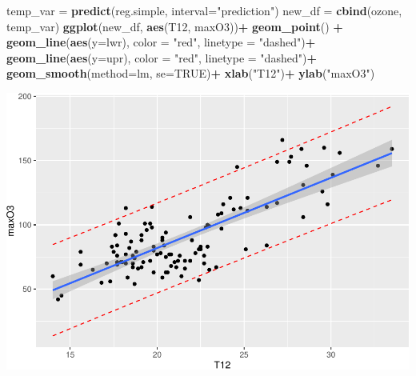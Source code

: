 \documentclass[
]{article}
\newenvironment{Shaded}{\begin{snugshade}}{\end{snugshade}}
\newcommand{\AttributeTok}[1]{\textcolor[rgb]{0.13,0.29,0.53}{#1}}
\newcommand{\ConstantTok}[1]{\textcolor[rgb]{0.56,0.35,0.01}{#1}}
\newcommand{\FunctionTok}[1]{\textcolor[rgb]{0.13,0.29,0.53}{\textbf{#1}}}
\newcommand{\NormalTok}[1]{#1}
\newcommand{\OtherTok}[1]{\textcolor[rgb]{0.56,0.35,0.01}{#1}}
\newcommand{\SpecialCharTok}[1]{\textcolor[rgb]{0.81,0.36,0.00}{\textbf{#1}}}
\newcommand{\StringTok}[1]{\textcolor[rgb]{0.31,0.60,0.02}{#1}}
\begin{document}
\begin{Shaded}
\begin{Highlighting}[]
\NormalTok{temp\_var }\OtherTok{=} \FunctionTok{predict}\NormalTok{(reg.simple, }
                  \AttributeTok{interval=}\StringTok{"prediction"}\NormalTok{)}
\NormalTok{new\_df }\OtherTok{=} \FunctionTok{cbind}\NormalTok{(ozone, temp\_var)}
\FunctionTok{ggplot}\NormalTok{(new\_df, }\FunctionTok{aes}\NormalTok{(T12, maxO3))}\SpecialCharTok{+}
    \FunctionTok{geom\_point}\NormalTok{() }\SpecialCharTok{+}
    \FunctionTok{geom\_line}\NormalTok{(}\FunctionTok{aes}\NormalTok{(}\AttributeTok{y=}\NormalTok{lwr), }\AttributeTok{color =} \StringTok{"red"}\NormalTok{, }
                       \AttributeTok{linetype =} \StringTok{"dashed"}\NormalTok{)}\SpecialCharTok{+}
    \FunctionTok{geom\_line}\NormalTok{(}\FunctionTok{aes}\NormalTok{(}\AttributeTok{y=}\NormalTok{upr), }\AttributeTok{color =} \StringTok{"red"}\NormalTok{, }
                       \AttributeTok{linetype =} \StringTok{"dashed"}\NormalTok{)}\SpecialCharTok{+}
    \FunctionTok{geom\_smooth}\NormalTok{(}\AttributeTok{method=}\NormalTok{lm, }\AttributeTok{se=}\ConstantTok{TRUE}\NormalTok{)}\SpecialCharTok{+}
    \FunctionTok{xlab}\NormalTok{(}\StringTok{"T12"}\NormalTok{)}\SpecialCharTok{+}  
    \FunctionTok{ylab}\NormalTok{(}\StringTok{"maxO3"}\NormalTok{)}
\end{Highlighting}
\end{Shaded}

\includegraphics{TP-ML-Regression_files/figure-latex/unnamed-chunk-14-1.pdf}
\end{document}
